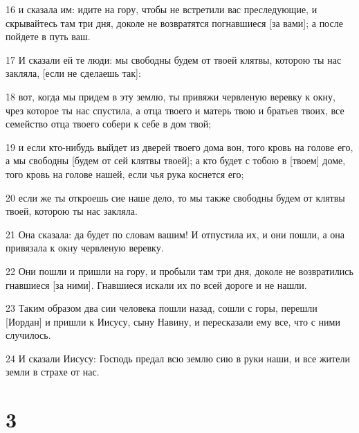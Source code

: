 \par 16 и сказала им: идите на гору, чтобы не встретили вас преследующие, и скрывайтесь там три дня, доколе не возвратятся погнавшиеся [за вами]; а после пойдете в путь ваш.
\par 17 И сказали ей те люди: мы свободны будем от твоей клятвы, которою ты нас закляла, [если не сделаешь так]:
\par 18 вот, когда мы придем в эту землю, ты привяжи червленую веревку к окну, чрез которое ты нас спустила, а отца твоего и матерь твою и братьев твоих, все семейство отца твоего собери к себе в дом твой;
\par 19 и если кто-нибудь выйдет из дверей твоего дома вон, того кровь на голове его, а мы свободны [будем от сей клятвы твоей]; а кто будет с тобою в [твоем] доме, того кровь на голове нашей, если чья рука коснется его;
\par 20 если же ты откроешь сие наше дело, то мы также свободны будем от клятвы твоей, которою ты нас закляла.
\par 21 Она сказала: да будет по словам вашим! И отпустила их, и они пошли, а она привязала к окну червленую веревку.
\par 22 Они пошли и пришли на гору, и пробыли там три дня, доколе не возвратились гнавшиеся [за ними]. Гнавшиеся искали их по всей дороге и не нашли.
\par 23 Таким образом два сии человека пошли назад, сошли с горы, перешли [Иордан] и пришли к Иисусу, сыну Навину, и пересказали ему все, что с ними случилось.
\par 24 И сказали Иисусу: Господь предал всю землю сию в руки наши, и все жители земли в страхе от нас.

\chapter{3}

